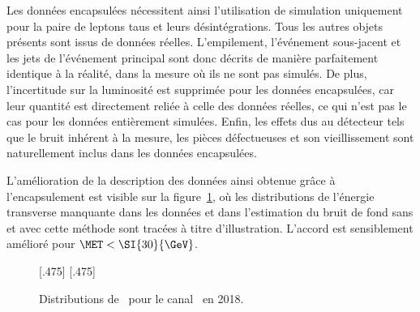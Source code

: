 \par
Les données encapsulées nécessitent ainsi l'utilisation de simulation uniquement pour la paire de leptons taus et leurs désintégrations.
Tous les autres objets présents sont issus de données réelles.
L'empilement, l'événement sous-jacent et les jets de l'événement principal sont donc décrits de manière parfaitement identique à la réalité, dans la mesure où ils ne sont pas simulés.
De plus, l'incertitude sur la luminosité est supprimée pour les données encapsulées, car leur quantité est directement reliée à celle des données réelles, ce qui n'est pas le cas pour les données entièrement simulées.
Enfin, les effets dus au détecteur tels que le bruit inhérent à la mesure, les pièces défectueuses et son vieillissement sont naturellement inclus dans les données encapsulées.
\par
L'amélioration de la description des données ainsi obtenue grâce à l'encapsulement est visible sur la figure~\ref{fig-embedding_2018mt_puppimet_illustration}, où les distributions de l'énergie transverse manquante dans les données et dans l'estimation du bruit de fond sans et avec cette méthode sont tracées à titre d'illustration.
L'accord est sensiblement amélioré pour $\MET < \SI{30}{\GeV}$.
\begin{figure}[h]
\centering

[.475\textwidth]
{}
\hfill
{}[.475\textwidth]
{}

\caption{Distributions de \MET\ pour le canal \mu\tauh\ en 2018.}
\label{fig-embedding_2018mt_puppimet_illustration}
\end{figure}

